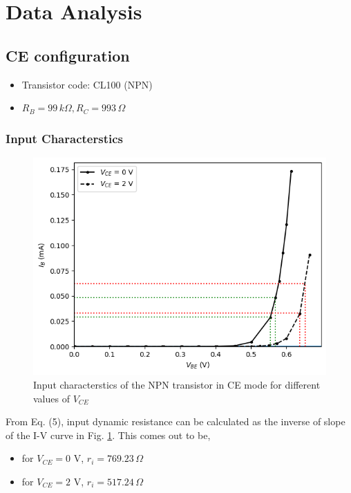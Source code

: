 \section{Data Analysis}

\subsection{CE configuration}

\begin{itemize}
    \item Transistor code: CL100 (NPN)
    \item $R_B = 99\,k\Omega, R_C = 993\,\Omega$
\end{itemize}

    \subsubsection*{\textbf{Input Characterstics}} 

    \begin{figure}[H]
        \centering
        \includegraphics[width=1\columnwidth]{images/g1.png}
        \caption{Input characterstics of the NPN transistor in CE mode for different values of $V_{CE}$}
        \label{graph:1}
    \end{figure}

   

    From Eq. (5), input dynamic resistance can be calculated as the inverse of slope of the I-V curve in Fig. \ref{graph:1}. This comes out to be, 

    \begin{itemize}
        \item for $V_{CE}=0$ V, $r_i=769.23\,\Omega$ 
        \item for $V_{CE}=2$ V, $r_i=517.24\,\Omega$ 
    \end{itemize}

